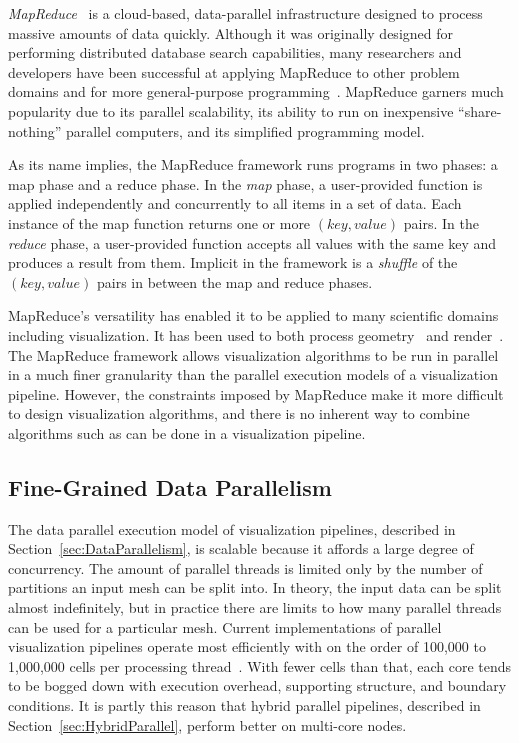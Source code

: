 \documentclass[journal,twocolumn,10pt,letterpaper,twoside]{IEEEtran}
\newcommand*{\lcite}[1]{~\cite{#1}}
\newcommand*{\keyterm}[1]{\emph{#1}}
\begin{document}
\keyterm{MapReduce}\lcite{MapReduce} is a cloud-based, data-parallel
infrastructure designed to process massive amounts of data quickly.
Although it was originally designed for performing distributed database
search capabilities, many researchers and developers have been successful
at applying MapReduce to other problem domains and for more general-purpose
programming\lcite{Olston2008,Isard2009}.  MapReduce garners much popularity
due to its parallel scalability, its ability to run on inexpensive
``share-nothing'' parallel computers, and its simplified programming model.

As its name implies, the MapReduce framework runs programs in two phases: a
map phase and a reduce phase.  In the \keyterm{map} phase, a user-provided
function is applied independently and concurrently to all items in a set of
data.  Each instance of the map function returns one or more $(key, value)$
pairs.  In the \keyterm{reduce} phase, a user-provided function accepts all
values with the same key and produces a result from them.  Implicit in the
framework is a \keyterm{shuffle} of the $(key, value)$ pairs in between the
map and reduce phases.

MapReduce's versatility has enabled it to be applied to many scientific
domains including visualization.  It has been used to both process
geometry\lcite{Vo2011} and render\lcite{Stuart2010,Vo2011}.  The MapReduce
framework allows visualization algorithms to be run in parallel in a much
finer granularity than the parallel execution models of a visualization
pipeline.  However, the constraints imposed by MapReduce make it more
difficult to design visualization algorithms, and there is no inherent way
to combine algorithms such as can be done in a visualization pipeline.

\subsection{Fine-Grained Data Parallelism}
\label{sec:FineGrainedParallelism}

The data parallel execution model of visualization pipelines, described in
Section~\ref{sec:DataParallelism}, is scalable because it affords a large
degree of concurrency.  The amount of parallel threads is limited only by
the number of partitions an input mesh can be split into.  In theory, the
input data can be split almost indefinitely, but in practice there are
limits to how many parallel threads can be used for a particular mesh.
Current implementations of parallel visualization pipelines operate most
efficiently with on the order of 100,000 to 1,000,000 cells per processing
thread\lcite{ParaViewTutorial}.  With fewer cells than that, each core
tends to be bogged down with execution overhead, supporting structure, and
boundary conditions.  It is partly this reason that hybrid parallel
pipelines, described in Section~\ref{sec:HybridParallel}, perform better on
multi-core nodes.
\end{document}
